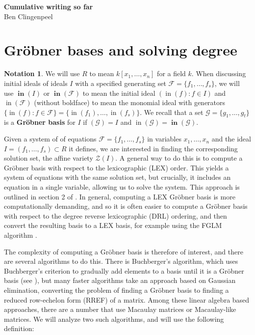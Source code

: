 \documentclass[11pt]{article}
\newcommand{\F}{\mathcal{F}}
\DeclareMathOperator{\init}{in}
\DeclareMathOperator{\Init}{\mathbf{in}}
\theoremstyle{definition}
\newtheorem*{notation}{Notation}
\begin{document}
\begin{center}
	\Huge{\textbf{Cumulative writing so far}}\\
	\vspace{.5em}
	\normalsize{Ben Clingenpeel}
\end{center}

\section{Gröbner bases and solving degree}

\begin{notation}
	We will use $R$ to mean $k[x_1, \dots, x_n]$ for a field $k$. When discussing initial ideals of ideals $I$ with a specified generating set $\F = \{f_1, \dots, f_s\}$, we will use $\Init(I)$ or $\Init(\F)$ to mean the initial ideal $(\init(f): f \in I)$ and $\init(\F)$ (without boldface) to mean the monomial ideal with generators $\{\init(f): f \in \F\} = \{\init(f_1), \dots, \init(f_s)\}$. We recall that a set $\mathcal{G} = \{g_1, \dots, g_t\}$ is a \textbf{Gröbner basis} for $I$ if $(\mathcal{G}) = I$ and $\init(\mathcal{G}) = \Init(\mathcal{G})$.
\end{notation}

Given a system of of equations $\mathcal{F} = \{f_1, \dots, f_s\}$ in variables $x_1, \dots, x_n$ and the ideal $I = (f_1, \dots, f_s) \subset R$ it defines, we are interested in finding the corresponding solution set, the affine variety $\mathcal{Z}(I)$. A general way to do this is to compute a Gröbner basis with respect to the lexicographic (LEX) order. This yields a system of equations with the same solution set, but crucially, it includes an equation in a single variable, allowing us to solve the system. This approach is outlined in section 2 of \cite{caminata2020solving}. In general, computing a LEX Gröbner basis is more computationally demanding, and so it is often easier to compute a Gröbner basis with respect to the degree reverse lexicographic (DRL) ordering, and then convert the resulting basis to a LEX basis, for example using the FGLM algorithm \cite{faugere1993efficient}.

The complexity of computing a Gröbner basis is therefore of interest, and there are several algorithms to do this. There is Buchberger's algorithm, which uses Buchberger's criterion to gradually add elements to a basis until it is a Gröbner basis (see \cite{cox2013ideals}), but many faster algorithms take an approach based on Gaussian elimination, converting the problem of finding a Gröbner basis to finding a reduced row-echelon form (RREF) of a matrix. Among these linear algebra based approaches, there are a number that use Macaulay matrices or Macaulay-like matrices. We will analyze two such algorithms, and will use the following definition:
\end{document}
